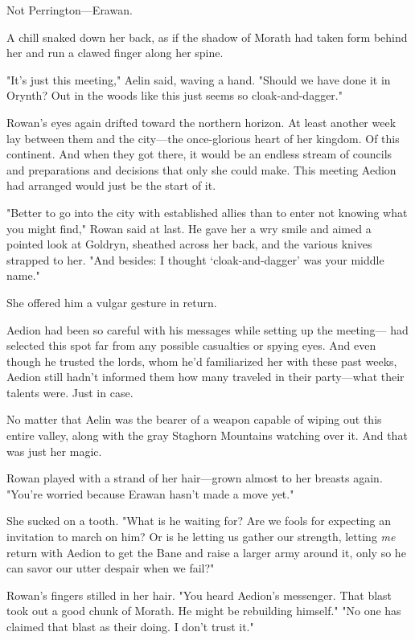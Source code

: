 Not Perrington---Erawan.

A chill snaked down her back, as if the shadow of Morath had taken form behind her and run a clawed finger along her spine.

"It's just  this meeting," Aelin said, waving a hand. "Should we have done it in Orynth? Out in the woods like this just seems so
 cloak-and-dagger."

Rowan's eyes again drifted toward the northern horizon. At least another week lay between them and the city---the once-glorious heart of her kingdom. Of this continent. And when they got there, it would be an endless stream of councils and preparations and decisions that only she could make. This meeting Aedion had arranged would just be the start of it.

"Better to go into the city with established allies than to enter not knowing what you might find," Rowan said at last. He gave her a wry smile and aimed a pointed look at Goldryn, sheathed across her back, and the various knives strapped to her. "And besides: I thought
`cloak-and-dagger' was your middle name."

She offered him a vulgar gesture in return.

Aedion had been so careful with his messages while setting up the meeting--- had selected this spot far from any possible casualties or spying eyes. And even though he trusted the lords, whom he'd familiarized her with these past weeks, Aedion still hadn't informed them how many traveled in their party---what their talents were. Just in case.

No matter that Aelin was the bearer of a weapon capable of wiping out this entire valley, along with the gray Staghorn Mountains watching over it. And that was just her magic.

Rowan played with a strand of her hair---grown almost to her breasts again. "You're worried because Erawan hasn't made a move yet."

She sucked on a tooth. "What is he waiting for? Are we fools for expecting an invitation to march on him? Or is he letting us gather our strength, letting \emph{me} return with Aedion to get the Bane and raise a larger army around it, only so he can savor our utter despair when we fail?"

Rowan's fingers stilled in her hair. "You heard Aedion's messenger. That blast took out a good chunk of Morath. He might be rebuilding himself." "No one has claimed that blast as their doing. I don't trust it."

